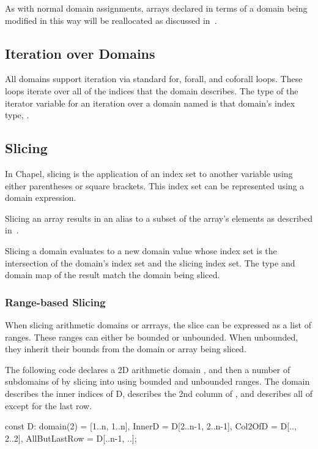 As with normal domain assignments, arrays declared in terms of a
domain being modified in this way will be reallocated as discussed
in~.



\subsection{Iteration over Domains}
\label{Iteration_over_Domains}

All domains support iteration via standard for, forall, and coforall
loops.  These loops iterate over all of the indices that the domain
describes.  The type of the iterator variable for an iteration over a
domain named  is that domain's index type, .


\subsection{Slicing}
\label{Slicing}

In Chapel, slicing is the application of an index set to another
variable using either parentheses or square brackets.  This index set
can be represented using a domain expression.


Slicing an array results in an alias to a subset of the array's
elements as described in~.

Slicing a domain evaluates to a new domain value whose index set is
the intersection of the domain's index set and the slicing index set.
The type and domain map of the result match the domain being sliced.

%
%

\subsubsection{Range-based Slicing}
\label{Range_Based_Slicing}
When slicing arithmetic domains or arrrays, the slice can be expressed
as a list of  ranges.  These ranges can either be bounded
or unbounded.  When unbounded, they inherit their bounds from the
domain or array being sliced.

\begin{example}
The following code declares a 2D arithmetic domain , and then
a number of subdomains of  by slicing into  using
bounded and unbounded ranges.  The  domain describes the
inner indices of D,  describes the 2nd column of
, and  describes all of  except
for the last row.

\begin{chapel}
const D: domain(2) = [1..n, 1..n],
      InnerD = D[2..n-1, 2..n-1],
      Col2OfD = D[.., 2..2],
      AllButLastRow = D[..n-1, ..];
\end{chapel}
\end{example}


